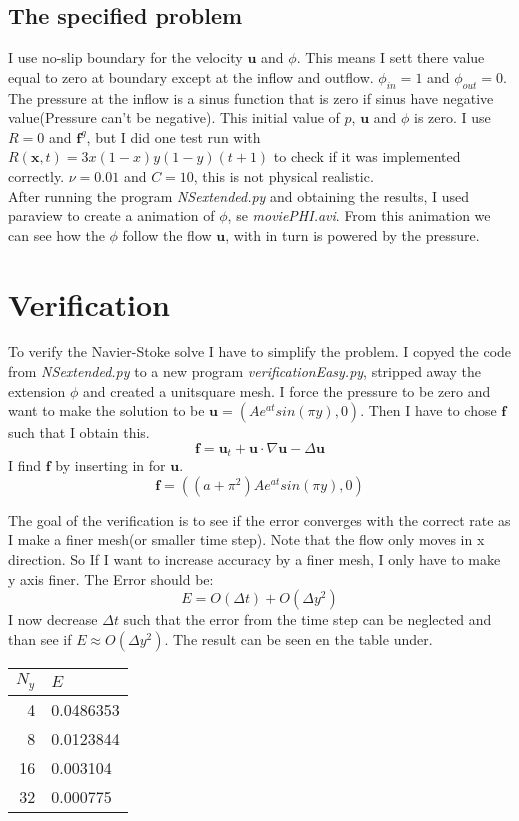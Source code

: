 \documentclass[12pt,a4paper,english]{article}
\begin{document}
\subsection*{The specified problem}

I use no-slip boundary for the velocity $\textbf{u}$ and $\phi$. This means I sett there value equal to zero at boundary except at the inflow and outflow. $\phi_{in} = 1$ and $\phi_{out} = 0$. The pressure at the inflow is a sinus function that is zero if sinus have negative value(Pressure can't be negative). This initial value of $p$, $\textbf{u}$ and $\phi$ is zero. I use $R = 0$ and $\textbf{f}^g$, but I did one test run with $R\left( \textbf{x},t \right)  = 3x\left( 1-x \right)y\left(1-y \right)\left(t+1\right)$ to check if it was implemented correctly. $\nu = 0.01$ and $C = 10$, this is not physical realistic. \\
After running the program \textit{NSextended.py} and obtaining the results, I used paraview to create a animation of $\phi$, se \textit{moviePHI.avi}. From this animation we can see how the $\phi$ follow the flow $\textbf{u}$, with in turn is powered by the pressure. 



\section*{Verification}

To verify the Navier-Stoke solve I have to simplify the problem. I copyed the code from \textit{NSextended.py} to a new program \textit{verificationEasy.py}, stripped away the extension $\phi$ and created a unitsquare mesh. I force the pressure to be zero and want to make the solution to be $\textbf{u} = \left( Ae^{at}sin\left(\pi y\right) , 0\right)$. Then I have to chose $\textbf{f}$ such that I obtain this.
$$
\textbf{f} = \textbf{u}_t +\textbf{u} \cdot \nabla \textbf{u} - \Delta \textbf{u}
$$ 
I find $\textbf{f}$ by inserting in for $\textbf{u}$.
$$
\textbf{f} = \left( \left(a + \pi^2\right) Ae^{at}sin\left(\pi y\right), 0\right) 
$$

The goal of the verification is to see if the error converges with the correct rate as I make a finer mesh(or smaller time step). Note that the flow only moves in x direction. So If I want to increase accuracy by a finer mesh, I only have to make y axis finer. The Error should be:
$$E = O\left(\Delta t\right) + O\left(\Delta y^2 \right)$$
I now decrease $\Delta t$ such that the error from the time step can be neglected and than see if $E \approx O\left(\Delta y^2 \right)$. The result can be seen en the table under. 
\begin{center}
\begin{tabular}{|r|l|}
  \hline
  $N_y$ & $E$ \\
  \hline
  	4 & 0.0486353 \\
  \hline
    8 & 0.0123844 \\
  \hline
    16 & 0.003104 \\
  \hline
    32 & 0.000775 \\
  \hline
\end{tabular}
\end{center}
\end{document}
